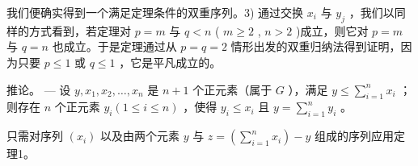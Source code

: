我们便确实得到一个满足定理条件的双重序列。3) 通过交换 \(x_{i}\) 与 \(y_{j}\) ，我们以同样的方式看到，若定理对 \(p = m\) 与 \(q < n\) ( \(m \geqslant 2\) , \(n > 2\) )成立，则它对 \(p = m\) 与 \(q = n\) 也成立。于是定理通过从 \(p = q = 2\) 情形出发的双重归纳法得到证明，因为只要 \(p \leqslant 1\) 或 \(q \leqslant 1\) ，它是平凡成立的。

推论。 --- 设 \(y, x_1, x_2, \ldots, x_n\) 是 \(n + 1\) 个正元素（属于 \(G\) ），满足 \(y \leqslant \sum_{i=1}^{n} x_i\) ；则存在 \(n\) 个正元素 \(y_i (1 \leqslant i \leqslant n)\) ，使得 \(y_i \leqslant x_i\) 且 \(y = \sum_{i=1}^{n} y_i\) 。

只需对序列 \((x_{i})\) 以及由两个元素 \(y\) 与 \(z = \left(\sum_{i=1}^{n} x_{i}\right) - y\) 组成的序列应用定理1。

